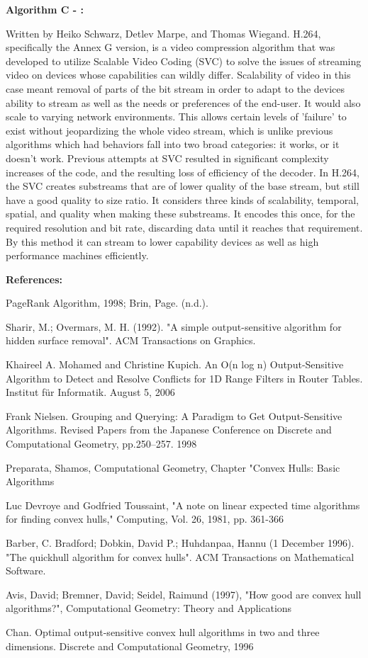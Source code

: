 \documentclass[12pt]{article}
\begin{document}
\bigskip
\noindent

\textbf{Algorithm C - :}\smallskip

Written by Heiko Schwarz, Detlev Marpe, and Thomas Wiegand. H.264, specifically the Annex G version, is a video compression algorithm that was developed to utilize Scalable Video Coding (SVC) to solve the issues of streaming video on devices whose capabilities can wildly differ. Scalability of video in this case meant removal of parts of the bit stream in order to adapt to the devices ability to stream as well as the needs or preferences of the end-user. It would also scale to varying network environments. This allows certain levels of 'failure' to exist without jeopardizing the whole video stream, which is unlike previous algorithms which had behaviors fall into two broad categories: it works, or it doesn't work. \newline
Previous attempts at SVC resulted in significant complexity increases of the code, and the resulting loss of efficiency of the decoder. In H.264, the SVC creates substreams that are of lower quality of the base stream, but still have a good quality to size ratio. It considers three kinds of scalability, temporal, spatial, and quality when making these substreams. It encodes this once, for the required resolution and bit rate, discarding data until it reaches that requirement. By this method it can stream to lower capability devices as well as high performance machines efficiently.
\bigskip

\textbf{References:}\smallskip

PageRank Algorithm, 1998; Brin, Page. (n.d.).

Sharir, M.; Overmars, M. H. (1992). "A simple output-sensitive algorithm for hidden surface removal". ACM Transactions on Graphics.

Khaireel A. Mohamed and Christine Kupich. An O(n log n) Output-Sensitive Algorithm to Detect and Resolve Conflicts for 1D Range Filters in Router Tables. Institut für Informatik. August 5, 2006
 
Frank Nielsen. Grouping and Querying: A Paradigm to Get Output-Sensitive Algorithms. Revised Papers from the Japanese Conference on Discrete and Computational Geometry, pp.250–257. 1998
  
Preparata, Shamos, Computational Geometry, Chapter "Convex Hulls: Basic Algorithms

Luc Devroye and Godfried Toussaint, "A note on linear expected time algorithms for finding convex hulls," Computing, Vol. 26, 1981, pp. 361-366

Barber, C. Bradford; Dobkin, David P.; Huhdanpaa, Hannu (1 December 1996). "The quickhull algorithm for convex hulls". ACM Transactions on Mathematical Software.

Avis, David; Bremner, David; Seidel, Raimund (1997), "How good are convex hull algorithms?", Computational Geometry: Theory and Applications

Chan. Optimal output-sensitive convex hull algorithms in two and three dimensions. Discrete and Computational Geometry, 1996
  
\end{document}
